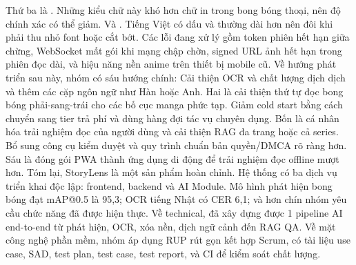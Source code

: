 {}Thứ ba là . Những kiểu chữ này khó hơn chữ in trong bong bóng thoại, nên độ chính xác có thể giảm.\markdownRendererParagraphSeparator
{}Và . Tiếng Việt có dấu và thường dài hơn nên đôi khi phải thu nhỏ font hoặc cắt bớt.\markdownRendererParagraphSeparator
{}Các lỗi đang xử lý gồm token phiên hết hạn giữa chừng, WebSocket mất gói khi mạng chập chờn, signed URL ảnh hết hạn trong phiên đọc dài, và hiệu năng nền anime trên thiết bị mobile cũ.\markdownRendererInterblockSeparator
{}
\markdownRendererSectionEnd \markdownRendererSectionBegin
{}\markdownRendererInterblockSeparator
{}Về hướng phát triển sau này, nhóm có sáu hướng chính:\markdownRendererParagraphSeparator
{}Cải thiện OCR và chất lượng dịch dịch và thêm các cặp ngôn ngữ như Hàn hoặc Anh.\markdownRendererParagraphSeparator
{}Hai là cải thiện thứ tự đọc bong bóng phải-sang-trái cho các bố cục manga phức tạp.\markdownRendererParagraphSeparator
{}Giảm cold start bằng cách chuyển sang tier trả phí và dùng hàng đợi tác vụ chuyên dụng.\markdownRendererParagraphSeparator
{}Bốn là cá nhân hóa trải nghiệm đọc của người dùng và cải thiện RAG đa trang hoặc cả series.\markdownRendererParagraphSeparator
{}Bổ sung công cụ kiểm duyệt và quy trình chuẩn bản quyền/DMCA rõ ràng hơn.\markdownRendererParagraphSeparator
{}Sáu là đóng gói PWA thành ứng dụng di động để trải nghiệm đọc offline mượt hơn.\markdownRendererInterblockSeparator
{}
\markdownRendererSectionEnd \markdownRendererSectionBegin
{}\markdownRendererInterblockSeparator
{}Tóm lại, StoryLens là một sản phẩm hoàn chỉnh.\markdownRendererParagraphSeparator
{}Hệ thống có ba dịch vụ triển khai độc lập: frontend, backend và AI Module. Mô hình phát hiện bong bóng đạt mAP@0.5 là 95,3\markdownRendererPercentSign{}; OCR tiếng Nhật có CER 6,1\markdownRendererPercentSign{}; và hơn chín nhóm yêu cầu chức năng đã được hiện thực.\markdownRendererParagraphSeparator
{}Về technical, đã xây dựng được 1 pipeline AI end-to-end từ phát hiện, OCR, xóa nền, dịch ngữ cảnh đến RAG Q\markdownRendererAmpersand{}A.\markdownRendererParagraphSeparator
{}Về mặt công nghệ phần mềm, nhóm áp dụng RUP rút gọn kết hợp Scrum, có tài liệu use case, SAD, test plan, test case, test report, và CI để kiểm soát chất lượng.\markdownRendererInterblockSeparator
{}
\markdownRendererSectionEnd \markdownRendererSectionBegin
{}\markdownRendererInterblockSeparator
